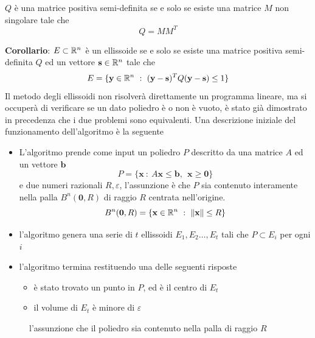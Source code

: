 \documentclass[10pt, letterpaper]{report}
\newcommand{\bb}{{\mathbf{b}}}
\newcommand{\bs}{{\mathbf{s}}}
\newcommand{\x}{{\mathbf{x}}}
\newcommand{\y}{{\mathbf{y}}}
\begin{document}
\begin{teorema}
    $Q$ è una matrice positiva semi-definita se e solo se esiste una matrice $M$ non singolare tale che $$ Q=MM^T$$ 
\end{teorema}
\textbf{Corollario}: $E\subset {\mathbb R}^n$ è un ellissoide se e solo se esiste una matrice positiva semi-definita $Q$ ed un vettore $\bs\in\R^n$ tale che 
$$ E=\{\y\in\R^n \ : \ (\y-\bs)^TQ(\y-\bs) \le 1\}  $$
Il metodo degli ellissoidi non risolverà direttamente un programma lineare, ma si occuperà di verificare se un dato poliedro è o non è vuoto, è stato già dimostrato in precedenza che i due problemi sono equivalenti. Una descrizione iniziale del funzionamento dell'algoritmo è la seguente\begin{itemize}
    \item L'algoritmo prende come input un poliedro $P$ descritto da una matrice $A$ ed un vettore $\bb$ 
    $$P=\{\x \ : \ A\x\le \bb, \ \ \x\ge \mathbf 0\} $$
    e due numeri razionali $R,\varepsilon$, l'assunzione è che $P$ sia contenuto interamente nella palla $B^n(\mathbf 0,R)$ di raggio $R$ centrata nell'origine.
    $$ B^n(\mathbf 0,R)=\{\x\in\R^n \ : \ \|\x\|\le R\}$$
    \item l'algoritmo genera una serie di $t$ ellissoidi $E_1,E_2\dots, E_t$ tali che 
    $P\subset E_i$ per ogni $i$
    \item l'algoritmo termina restituendo una delle seguenti risposte \begin{itemize}
        \item è stato trovato un punto in $P$, ed è il centro di $E_t$
        \item il volume di $E_t$ è minore di $\varepsilon$
    \end{itemize}
\end{itemize}

\begin{figure}[h]
    \caption{l'assunzione che il poliedro sia contenuto nella palla di raggio $R$}
\end{figure}
\end{document}
